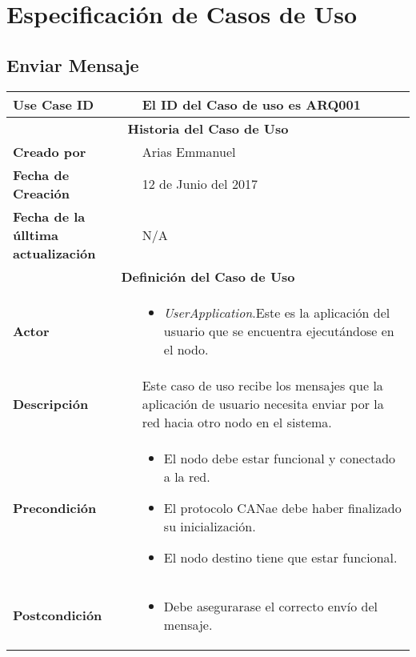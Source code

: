 \chapter{Especificación de Casos de Uso}\label{Appendix:UseCase}



\section{Enviar Mensaje}

\begin{longtable}{|p{5cm}|p{8cm}|}
  \hline
  \textbf{Use Case ID} & El ID del Caso de uso es ARQ001 \\ \hline
  \multicolumn{2}{|c|}{\Large\textbf{Historia del Caso de Uso}} \\ \hline
  \textbf{Creado por} & Arias Emmanuel \\ \hline
  \textbf{Fecha de Creación} & 12 de Junio del 2017 \\ \hline
  \textbf{Fecha de la úlltima actualización} & N/A \\ \hline
  \multicolumn{2}{|c|}{\Large\textbf{Definición del Caso de Uso}} \\ \hline
  \textbf{Actor} & \begin{itemize}
    \item \textit{UserApplication}.Este es la aplicación del usuario que se encuentra ejecutándose en el nodo.
  \end{itemize} \\ \hline
  \textbf{Descripción} & Este caso de uso recibe los mensajes que la aplicación de usuario necesita enviar
  por la red hacia otro nodo en el sistema. \\ \hline
  \textbf{Precondición} & \begin{itemize}
\item El nodo debe estar funcional y conectado a la red.
\item El protocolo CANae debe haber finalizado su inicialización.
\item El nodo destino tiene que estar funcional.
  \end{itemize} \\ \hline
  \textbf{Postcondición}  & \begin{itemize}
\item Debe asegurarase el correcto envío del mensaje.

\end{itemize}
\end{longtable}
